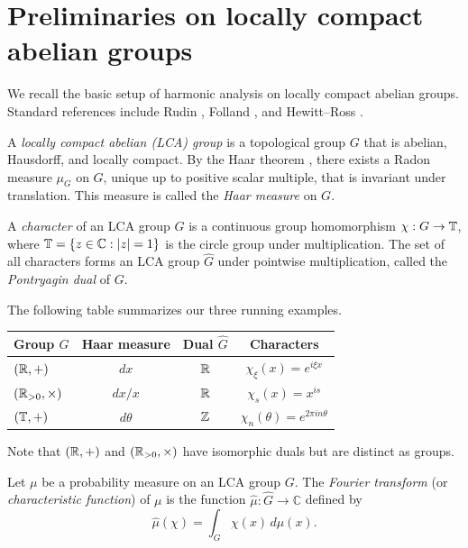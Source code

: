 \section{Preliminaries on locally compact abelian groups}

We recall the basic setup of harmonic analysis on locally compact abelian groups. Standard references include Rudin \cite{Rudin}, Folland \cite{Folland}, and Hewitt--Ross \cite{HewittRoss}.

\begin{definition}\label{def:LCA}
A \emph{locally compact abelian (LCA) group} is a topological group $G$ that is abelian, Hausdorff, and locally compact. By the Haar theorem \cite[Theorem~2.10]{Folland}, there exists a Radon measure $\mu_G$ on $G$, unique up to positive scalar multiple, that is invariant under translation. This measure is called the \emph{Haar measure} on $G$.
\end{definition}

\begin{definition}\label{def:dual}
A \emph{character} of an LCA group $G$ is a continuous group homomorphism $\chi : G \to \mathbb{T}$, where $\mathbb{T} = \{z \in \mathbb{C} : |z| = 1\}$ is the circle group under multiplication. The set of all characters forms an LCA group $\widehat{G}$ under pointwise multiplication, called the \emph{Pontryagin dual} of $G$.
\end{definition}

\begin{example}\label{ex:groups}
The following table summarizes our three running examples.
\begin{center}
\renewcommand{\arraystretch}{1.4}
\begin{tabular}{lccc}
\textbf{Group $G$} & \textbf{Haar measure} & \textbf{Dual $\widehat{G}$} & \textbf{Characters} \\
\hline
$(\mathbb{R}, +)$ & $dx$ & $\mathbb{R}$ & $\chi_\xi(x) = e^{i\xi x}$ \\
$(\mathbb{R}_{>0}, \times)$ & $dx/x$ & $\mathbb{R}$ & $\chi_s(x) = x^{is}$ \\
$(\mathbb{T}, +)$ & $d\theta$ & $\mathbb{Z}$ & $\chi_n(\theta) = e^{2\pi i n\theta}$
\end{tabular}
\end{center}
Note that $(\mathbb{R}, +)$ and $(\mathbb{R}_{>0}, \times)$ have isomorphic duals but are distinct as groups.
\end{example}

\begin{definition}\label{def:FT}
Let $\mu$ be a probability measure on an LCA group $G$. The \emph{Fourier transform} (or \emph{characteristic function}) of $\mu$ is the function $\widehat{\mu} : \widehat{G} \to \mathbb{C}$ defined by
\[
\widehat{\mu}(\chi) = \int_G \chi(x) \, d\mu(x).
\]
\end{definition}

